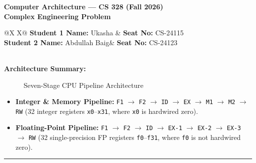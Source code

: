 \documentclass[11pt, a4paper]{article}
\begin{document}
\begin{center}
    {\LARGE \textbf{\textcolor{accent}{Computer Architecture --- CS 328 (Fall 2026)}}}\\[4pt]
    {\Large \textbf{Complex Engineering Problem}}
\end{center}

\vspace{4pt}
\begin{tabularx}{\textwidth}{@{}X X@{}}
    \toprule
    \textbf{Student 1 Name:} Ukasha & \textbf{Seat No:} CS-24115 \\
    \midrule
    \textbf{Student 2 Name:} Abdullah Baig& \textbf{Seat No:} CS-24123 \\
    \midrule
     \\
    \bottomrule
\end{tabularx}

\vspace{8pt}
\textbf{Architecture Summary:}

\begin{figure}[htbp]
    \centering

    \resizebox{\textwidth}{!}{}

    \caption{Seven-Stage CPU Pipeline Architecture}
    \label{fig:cpu-pipeline}
\end{figure}

\begin{itemize}[noitemsep, topsep=2pt]
    \item \textbf{Integer \& Memory Pipeline:} \texttt{F1} $\rightarrow$ \texttt{F2} $\rightarrow$ \texttt{ID} $\rightarrow$ \texttt{EX} $\rightarrow$ \texttt{M1} $\rightarrow$ \texttt{M2} $\rightarrow$ \texttt{RW} (32 integer registers \texttt{x0}--\texttt{x31}, where \texttt{x0} is hardwired zero).
    \item \textbf{Floating-Point Pipeline:} \texttt{F1} $\rightarrow$ \texttt{F2} $\rightarrow$ \texttt{ID} $\rightarrow$ \texttt{EX-1} $\rightarrow$ \texttt{EX-2} $\rightarrow$ \texttt{EX-3} $\rightarrow$ \texttt{RW} (32 single-precision FP registers \texttt{f0}--\texttt{f31}, where \texttt{f0} is not hardwired zero).
\end{itemize}

\hrule
\vspace{8pt}

\end{document}
